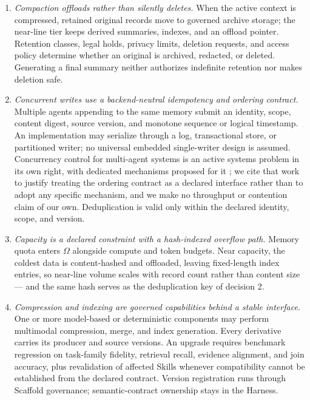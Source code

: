 \begin{enumerate}
\item \textit{Compaction offloads rather than silently deletes.} When the active context is compressed, retained original records move to governed archive storage; the near-line tier keeps derived summaries, indexes, and an offload pointer. Retention classes, legal holds, privacy limits, deletion requests, and access policy determine whether an original is archived, redacted, or deleted. Generating a final summary neither authorizes indefinite retention nor makes deletion safe.
\item \textit{Concurrent writes use a backend-neutral idempotency and ordering contract.} Multiple agents appending to the same memory submit an identity, scope, content digest, source version, and monotone sequence or logical timestamp. An implementation may serialize through a log, transactional store, or partitioned writer; no universal embedded single-writer design is assumed. Concurrency control for multi-agent systems is an active systems problem in its own right, with dedicated mechanisms proposed for it \cite{lyu2026coagent}; we cite that work to justify treating the ordering contract as a declared interface rather than to adopt any specific mechanism, and we make no throughput or contention claim of our own. Deduplication is valid only within the declared identity, scope, and version.
\item \textit{Capacity is a declared constraint with a hash-indexed overflow path.} Memory quota enters $\Omega$ alongside compute and token budgets. Near capacity, the coldest data is content-hashed and offloaded, leaving fixed-length index entries, so near-line volume scales with record count rather than content size --- and the same hash serves as the deduplication key of decision 2.
\item \textit{Compression and indexing are governed capabilities behind a stable interface.} One or more model-based or deterministic components may perform multimodal compression, merge, and index generation. Every derivative carries its producer and source versions. An upgrade requires benchmark regression on task-family fidelity, retrieval recall, evidence alignment, and join accuracy, plus revalidation of affected Skills whenever compatibility cannot be established from the declared contract. Version registration runs through Scaffold governance; semantic-contract ownership stays in the Harness.
\end{enumerate}

